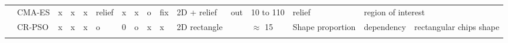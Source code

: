 \begin{landscape}
\begin{table}[]
\begin{tabular}{@{}  l|p{1.6cm} p{1.7cm} l  l p{0.659cm} p{0.612cm}p{.659cm} p{1.11cm} p{1.5cm} p{1.57cm}p{0.9cm}p{1.6cm}p{1.3cm}p{1.2cm} p{1.2cm}@{}}
\multicolumn{1}{l|}{\cellcolor[HTML]{FFFFFF}\cite{141*akbarzadeh2013}} & CMA-ES                                                                                                         & x                                                                     & x                                              & x                                              & relief                                         & x                                                & x                                                 & o                                                 & fix                                                       & 2D + \newline relief                                                                                                     & out                                                          & 10 to 110                                                                                                 & relief                                                                                                              & \multicolumn{2}{l}{\cellcolor[HTML]{FFFFFF}region of interest}   \\
\rowcolor[HTML]{EFEFEF} 
\multicolumn{1}{l|}{\cellcolor[HTML]{EFEFEF}\cite{143*maji2015}} & CR-PSO                                                                                                         & x                                                                     & x                                              & x                                              & o                                              & 0                                                & o                                                 & x                                                 & x                                                         & 2D \newline rectangle                                                                                                    &                                                              & $\approx$ 15                                                                                              & Shape proportion                                                                                                            & dependency                    & rectangular chips shape          \\
\rowcolor[HTML]{FFFFFF} 

\end{tabular}
\end{table}
\end{landscape}

